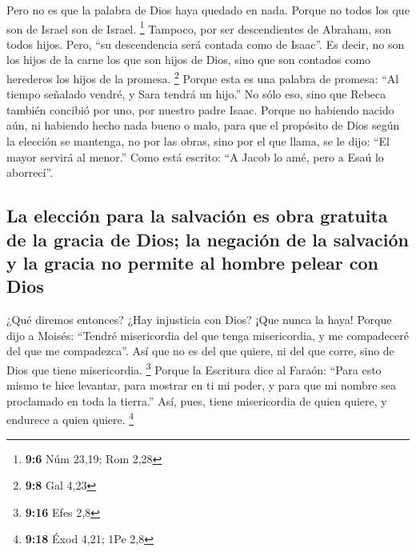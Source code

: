 \begin{paracol}{2}
 Pero no es que la palabra de Dios haya quedado en nada.
Porque no todos los que son de Israel son de Israel. \footnote{\textbf{9:6}
  Núm 23,19; Rom 2,28}  Tampoco, por ser descendientes de
Abraham, son todos hijos. Pero, ``su descendencia será contada como de
Isaac''.  Es decir, no son los hijos de la carne los que
son hijos de Dios, sino que son contados como herederos los hijos de la
promesa. \footnote{\textbf{9:8} Gal 4,23}  Porque esta es
una palabra de promesa: ``Al tiempo señalado vendré, y Sara tendrá un
hijo.''  No sólo eso, sino que Rebeca también concibió
por uno, por nuestro padre Isaac.  Porque no habiendo
nacido aún, ni habiendo hecho nada bueno o malo, para que el propósito
de Dios según la elección se mantenga, no por las obras, sino por el que
llama,  se le dijo: ``El mayor servirá al menor.''
 Como está escrito: ``A Jacob lo amé, pero a Esaú lo
aborrecí''.

\hypertarget{la-elecciuxf3n-para-la-salvaciuxf3n-es-obra-gratuita-de-la-gracia-de-dios-la-negaciuxf3n-de-la-salvaciuxf3n-y-la-gracia-no-permite-al-hombre-pelear-con-dios}{%
\subsection{La elección para la salvación es obra gratuita de la gracia
de Dios; la negación de la salvación y la gracia no permite al hombre
pelear con
Dios}\label{la-elecciuxf3n-para-la-salvaciuxf3n-es-obra-gratuita-de-la-gracia-de-dios-la-negaciuxf3n-de-la-salvaciuxf3n-y-la-gracia-no-permite-al-hombre-pelear-con-dios}}

 ¿Qué diremos entonces? ¿Hay injusticia con Dios? ¡Que
nunca la haya!  Porque dijo a Moisés: ``Tendré
misericordia del que tenga misericordia, y me compadeceré del que me
compadezca''.  Así que no es del que quiere, ni del que
corre, sino de Dios que tiene misericordia. \footnote{\textbf{9:16} Efes
  2,8}  Porque la Escritura dice al Faraón: ``Para esto
mismo te hice levantar, para mostrar en ti mi poder, y para que mi
nombre sea proclamado en toda la tierra.''  Así, pues,
tiene misericordia de quien quiere, y endurece a quien quiere.
\footnote{\textbf{9:18} Éxod 4,21; 1Pe 2,8}


\end{paracol}

